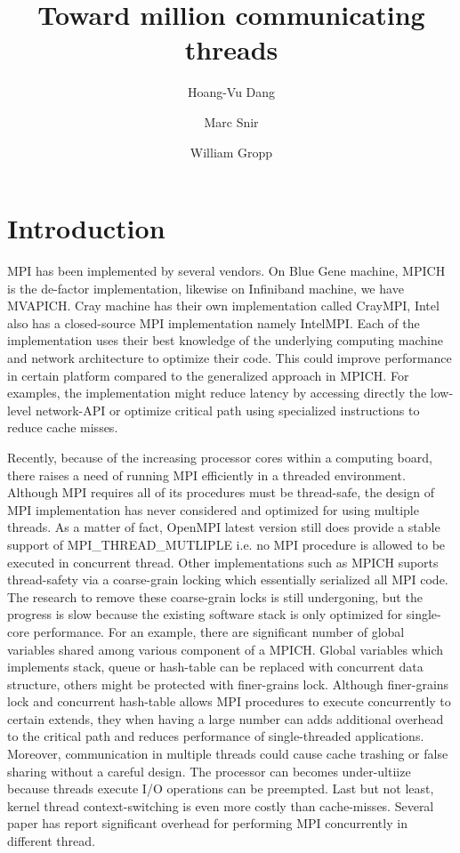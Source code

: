 \documentclass[11pt]{article}
\title{Toward million communicating threads}
\author{Hoang-Vu Dang \and Marc Snir \and William Gropp}
\begin{document}
\maketitle


\section{Introduction}
MPI has been implemented by several vendors. On Blue Gene machine, MPICH is the
de-factor implementation, likewise on Infiniband machine, we have MVAPICH. Cray
machine has their own implementation called CrayMPI, Intel also has a
closed-source MPI implementation namely IntelMPI. Each of the implementation
uses their best knowledge of the underlying computing machine and network
architecture to optimize their code. This could improve performance in certain platform
compared to the generalized approach in MPICH. For examples, the implementation might
reduce latency by accessing directly the low-level network-API or optimize
critical path using specialized instructions to reduce cache misses.

Recently, because of the increasing processor cores within a computing board,
there raises a need of running MPI efficiently in a threaded environment.
Although MPI requires all of its procedures must be thread-safe, the design of
MPI implementation has never considered and optimized for using multiple
threads. As a matter of fact, OpenMPI latest version still does provide a
stable support of MPI\_THREAD\_MUTLIPLE i.e. no MPI procedure is allowed to be
executed in concurrent thread. Other implementations such as MPICH suports
thread-safety via a coarse-grain locking which essentially serialized all MPI
code. The research to remove these coarse-grain locks is still undergoning, but
the progress is slow because the existing software stack is only optimized for
single-core performance. For an example, there are significant number of global
variables shared among various component of a MPICH. Global variables which
implements stack, queue or hash-table can be replaced with concurrent data
structure, others might be protected with finer-grains lock. Although
finer-grains lock and concurrent hash-table allows MPI procedures to execute
concurrently to certain extends, they when having a large number can adds
additional overhead to the critical path and reduces performance of
single-threaded applications. Moreover, communication in multiple threads could
cause cache trashing or false sharing without a careful design.  The processor
can becomes under-ultiize because threads execute I/O operations can be
preempted. Last but not least, kernel thread context-switching is even more
costly than cache-misses. Several paper has report significant overhead for
performing MPI concurrently in different thread.
\end{document}
